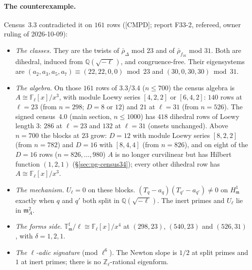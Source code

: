 \documentclass[11pt]{article}
\newcommand{\Q}{\mathbb{Q}}
\newcommand{\Fl}{\mathbb{F}_\ell}
\newcommand{\Zl}{\mathbb{Z}_\ell}
\newcommand{\T}{\mathbb{T}}
\newcommand{\m}{\mathfrak{m}}
\newcommand{\rhobar}{\bar\rho}
\newcommand{\CMPD}{\textsf{\small[CMPD]}}
\begin{document}
\paragraph{The counterexample.} Census~3.3 contradicted it on $161$ rows (\CMPD; report F33-2, refereed, owner ruling of 2026-10-09):
\begin{itemize}[leftmargin=1.6em,itemsep=1pt]
\item \emph{The classes.} They are the twists of $\rhobar_\Delta$ mod $23$ and of $\rhobar_{f_{16}}$ mod $31$. Both are dihedral, induced
  from $\Q(\sqrt{-\ell})$, and congruence-free. Their eigensystems are $(a_2,a_3,a_5,a_7)\equiv(22,22,0,0)\bmod23$ and
  $(30,0,30,30)\bmod31$.
\item \emph{The algebra.} On those $161$ rows of 3.3/3.4 ($n\le700$) the census algebra is $A\cong\Fl[x]/x^{3}$, with module Loewy series
  $[4,2,2]$ or $[6,4,2]$: $140$ rows at $\ell=23$ (from $n=298$; $D=8$ or $12$) and $21$ at $\ell=31$ (from $n=526$). The signed census~4.0
  (main section, $n\le1000$) has $418$ dihedral rows of Loewy length $3$: $286$ at $\ell=23$ and $132$ at $\ell=31$ (onsets unchanged). Above
  $n=700$ the blocks at $23$ grow: $D=12$ with module Loewy series $[8,2,2]$ (from $n=782$) and $D=16$ with $[8,4,4]$ (from $n=826$), and on
  eight of the $D=16$ rows ($n=826,\dots,980$) $A$ is no longer curvilinear but has Hilbert function $(1,2,1)$ (\S\ref{sec:pg-census34}); every
  other dihedral row has $A\cong\Fl[x]/x^{3}$.
\item \emph{The mechanism.} $U_\ell=0$ on these blocks. $(T_q-a_q)(T_{q'}-a_{q'})\ne0$ on $H^{1}_\m$ exactly when $q$ and $q'$ both split in
  $\Q(\sqrt{-\ell})$. The inert primes and $U_\ell$ lie in $\m_A^{2}$.
\item \emph{The forms side.} $\T^{\mathrm f}_\m/\ell\cong\Fl[x]/x^{4}$ at $(298,23)$, $(540,23)$ and $(526,31)$, with $\delta=1,2,1$.
\item \emph{The $\ell$-adic signature} (mod $\ell^{6}$). The Newton slope is $1/2$ at split primes and $1$ at inert primes; there is no
  $\Zl$-rational eigenform.
\end{itemize}
\end{document}
